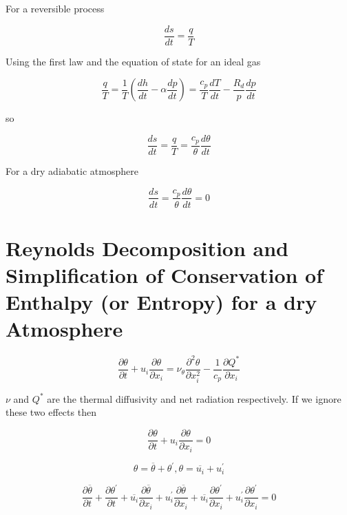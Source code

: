 For a reversible process

\begin{equation}
\frac{ds}{dt} = \frac{q}{T}
\end{equation}

Using the first law and the equation of state for an ideal gas

\begin{equation}
\frac{q}{T} = \frac{1}{T} \left(\frac{dh}{dt} - \alpha \frac{dp}{dt}\right) =  \frac{c_{p}}{T} \frac{dT}{dt} - \frac{R_{d}}{p} \frac{dp}{dt}
\end{equation}

so

\begin{equation}
\frac{ds}{dt} = \frac{q}{T} =  \frac{c_{p}}{\theta}\frac{d\theta}{dt}
\end{equation}

For a dry adiabatic atmosphere

\begin{equation}
\frac{ds}{dt} =  \frac{c_{p}}{\theta}\frac{d\theta}{dt} = 0
\end{equation}

\section{Reynolds Decomposition and Simplification of Conservation of Enthalpy (or Entropy) for a dry Atmosphere}
\label{sec:rdent}
\begin{equation}
\frac{\partial \theta}{\partial t} + u_{i}\frac{\partial \theta}{\partial x_{i}} = \nu_{\theta} \frac{\partial^{2}\theta}{\partial x_{i}^{2}} - \frac{1}{c_{p}}\frac{\partial Q^{*}}{\partial x_{i}}
\end{equation}

$\nu$ and $Q^{*}$ are the thermal diffusivity and net radiation respectively.  If we ignore these two effects then

\begin{equation}
\frac{\partial \theta}{\partial t} + u_{i}\frac{\partial \theta}{\partial x_{i}} = 0
\end{equation}

\begin{equation}
\theta = \overline{\theta} + \theta^{'}, \theta = \overline{u_{i}} + u_{i}^{'} 
\end{equation}

\begin{equation}
\frac{\partial \overline{\theta}}{\partial t} + \frac{\partial \theta^{'}}{\partial t} + \overline{u_{i}}\frac{\partial \overline{\theta}}{\partial x_{i}} + u_{i}^{'}\frac{\partial \overline{\theta}}{\partial x_{i}} + \overline{u_{i}}\frac{\partial \theta^{'}}{\partial x_{i}} + u_{i}^{'}\frac{\partial \theta^{'}}{\partial x_{i}} = 0
\end{equation}

